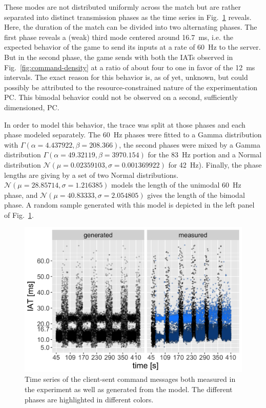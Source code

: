 These modes are not distributed uniformly across the match but are rather separated into distinct transmission phases as the time series in Fig.~\ref{fig:command-timeseries} reveals. Here, the duration of the match can be divided into two alternating phases. The first phase reveals a (weak) third mode centered around \SI{16.7}{\milli\second}, i.e. the expected behavior of the game to send its inputs at a rate of \SI{60}{\hertz} to the server. But in the second phase, the game sends with both the \glspl{IAT} observed in Fig.~\ref{fig:command-density} at a ratio of about four to one in favor of the \SI{12}{\milli\second} intervals. The exact reason for this behavior is, as of yet, unknown, but could possibly be attributed to the resource-constrained nature of the experimentation PC. This bimodal behavior could not be observed on a second, sufficiently dimensioned, PC.

In order to model this behavior, the trace was split at those phases and each phase modeled separately. The \SI{60}{\hertz} phases were fitted to a Gamma distribution with $\Gamma(\alpha = 4.437922, \beta = 208.366)$, the second phases were mixed by a Gamma distribution $\Gamma(\alpha = 49.32119, \beta = 3970.154)$ for the \SI{83}{\hertz} portion and a Normal distribution $\mathcal{N}(\mu = 0.02359103, \sigma = 0.001369922)$ for \SI{42}{\hertz}). Finally, the phase lengths are giving by a set of two Normal distributions. $\mathcal{N}(\mu = 28.85714, \sigma = 1.216385)$ models the length of the unimodal \SI{60}{\hertz} phase, and $\mathcal{N}(\mu = 40.83333, \sigma = 2.054805)$ gives the length of the bimodal phase. A random sample generated with this model is depicted in the left panel of Fig.~\ref{fig:command-timeseries}.


\begin{figure}[t]
	\centering
	\includegraphics[width=1.0\columnwidth]{images/command-ts-annotated.png}
	\caption{Time series of the client-sent command messages both measured in the experiment as well as generated from the model. The different phases are highlighted in different colors.}
\label{fig:command-timeseries}
\end{figure}



